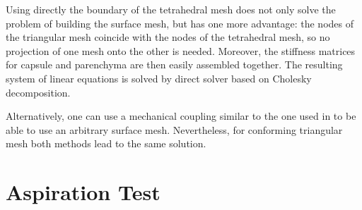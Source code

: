 \documentclass{acm_proc_article-sp}
\newcommand{\CD}[1]{{\color{green}\textbf{CD: #1}}}
\newcommand{\Mat}[1]{\mathbf{#1}}
\begin{document}
Using directly the boundary of the tetrahedral mesh does not only solve the
problem of building the surface mesh, but has one more advantage: the nodes
of the triangular mesh coincide with the nodes of the tetrahedral mesh, so no projection of one mesh onto the other is needed.
Moreover, the stiffness matrices for capsule and parenchyma are then easily assembled
together.
%
The resulting system of linear equations is solved by direct solver based on Cholesky decomposition.

Alternatively, one can use a mechanical coupling similar to the one used in
\cite{Peterlik2012} to be able to use an arbitrary surface mesh. Nevertheless,
for conforming triangular mesh both methods lead to the same solution.




\section{Aspiration Test} %
\end{document}
